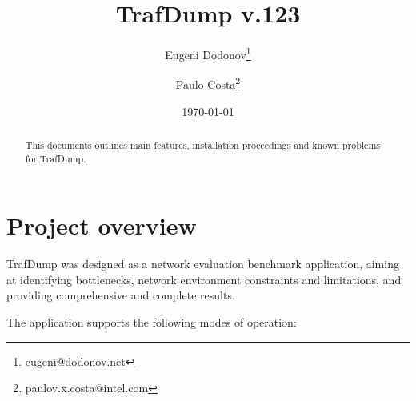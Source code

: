 \documentclass[12pt]{report}
\title{TrafDump v.123}
\author{Eugeni Dodonov\footnote{eugeni@dodonov.net} \and Paulo Costa\footnote{paulov.x.costa@intel.com}}
\date{\today}
\begin{document}
\maketitle

\begin{abstract}

This documents outlines main features, installation proceedings and known problems for TrafDump.

\end{abstract}

\tableofcontents

\chapter{Project overview}

TrafDump was designed as a network evaluation benchmark application, aiming at
identifying bottlenecks, network environment constraints and limitations,
and providing comprehensive and complete results.

The application supports the following modes of operation:
\end{document}
